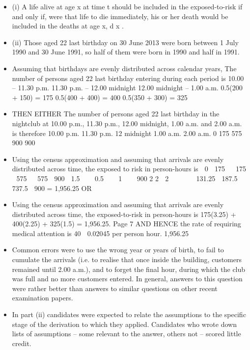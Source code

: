 \documentclass[a4paper,12pt]{article}
\begin{document}
\begin{itemize}
    \item (i) A life alive at age x at time t should be included in the
exposed-to-risk if and only if, were that life to die immediately,
his or her death would be included in the deaths at age x, d x .
\item (ii) Those aged 22 last birthday on 30 June 2013 were born between 1 July 1990
and 30 June 1991, so half of them were born in 1990 and half in 1991.
\item Assuming that birthdays are evenly distributed across calendar years,
The number of persons aged 22 last birthday entering during each period is
10.00 – 11.30 p.m.
11.30 p.m. – 12.00 midnight
12.00 midnight – 1.00 a.m.
0.5(200 + 150) = 175
0.5(400 + 400) = 400
0.5(350 + 300) = 325
\item THEN EITHER
The number of persons aged 22 last birthday in the nightclub at 10.00 p.m.,
11.30 p.m., 12.00 midnight, 1.00 a.m. and 2.00 a.m. is therefore
10.00 p.m.
11.30 p.m.
12 midnight
1.00 a.m.
2.00 a.m.
0
175
575
900
900
\item Using the census approximation and assuming that arrivals are evenly
distributed across time,
the exposed to risk in person-hours is
 0  175 
 175  575   575  900 
1.5 
  0.5 
  1 
  900
2
2
 2 

 

 131.25  187.5  737.5  900
= 1,956.25
OR
\item Using the census approximation and assuming that arrivals are evenly
distributed across time,
the exposed-to-risk in person-hours is
175(3.25) + 400(2.25) + 325(1.5) = 1,956.25.
Page 7 %
AND HENCE
the rate of requiring medical attention is
40
 0.02045 per person hour.
1,956.25
\item 
Common errors were to use the wrong year or years of birth, to fail to cumulate the arrivals
(i.e. to realise that once inside the building, customers remained until 2.00 a.m.), and to
forget the final hour, during which the club was full and no more customers entered. In
general, answers to this question were rather better than answers to similar questions on
other recent examination papers. 
\item In part (ii) candidates were expected to relate the
assumptions to the specific stage of the derivation to which they applied. Candidates who
wrote down lists of assumptions – some relevant to the answer, others not – scored little
credit.
\end{itemize}
\end{document}
